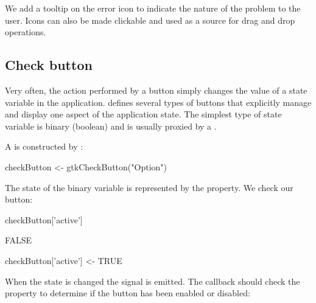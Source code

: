 \begin{Schunk}
\end{Schunk}
%
We add a tooltip on the error icon to indicate the nature of the
problem to the user. Icons can also be made clickable and used as a
source for drag and drop operations.

\subsection{Check button}
\label{sec:RGtk2:gtkCheckbox}

Very often, the action performed by a button simply changes the value
of a state variable in the application. \GTK\/ defines several types
of buttons that explicitly manage and display one aspect of the
application state. The simplest type of state variable is binary
(boolean) and is usually proxied by a .

A  is constructed by
:
\begin{Schunk}
\begin{Sinput}
 checkButton <- gtkCheckButton("Option")
\end{Sinput}
\end{Schunk}
%
The state of the binary variable is represented by the
 property. We check our button:
\begin{Schunk}
\begin{Sinput}
 checkButton['active']
\end{Sinput}
\begin{Soutput}
[1] FALSE
\end{Soutput}
\begin{Sinput}
 checkButton['active'] <- TRUE
\end{Sinput}
\end{Schunk}

When the state is changed the  signal is emitted. The
callback should check the  property to determine if the
button has been enabled or disabled:
\begin{Schunk}
\end{Schunk}

